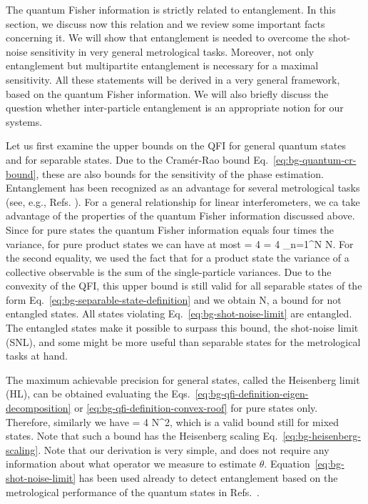 
The quantum Fisher information is strictly related to entanglement.
In this section, we discuss now this relation and we review some important facts concerning it.
We will show that entanglement is needed to overcome the shot-noise sensitivity in very general metrological tasks.
Moreover, not only entanglement but multipartite entanglement is necessary for a maximal sensitivity.
All these statements will be derived in a very general framework, based on the quantum Fisher information.
We will also briefly discuss the question whether inter-particle entanglement is an appropriate notion for our systems.

Let us first examine the upper bounds on the QFI for general quantum states and for separable states.
Due to the Cram\'er-Rao bound Eq.~\eqref{eq:bg-quantum-cr-bound}, these are also bounds for the sensitivity of the phase estimation.
Entanglement has been recognized as an advantage for several metrological tasks (see, e.g., Refs. \citep{Sorensen2001, Boixo2008}).
For a general relationship for linear interferometers, we ca take advantage of the properties of the quantum Fisher information discussed above.
Since for pure states the quantum Fisher information equals four times the variance, for pure product states we can have at most
\be
   = 4 = 4 \sum_{n=1}^N  \leq N.
\ee
For the second equality, we used the fact that for a product state the variance of a collective observable is the sum of the single-particle variances.
Due to the convexity of the QFI, this upper bound is still valid for all separable states of the form Eq.~\eqref{eq:bg-separable-state-definition} and we obtain \citep{Pezze2009}
\be
  \label{eq:bg-shot-noise-limit}
   \leq N,
\ee
a bound for not entangled states.
All states violating Eq.~\eqref{eq:bg-shot-noise-limit} are entangled.
The entangled states make it possible to surpass this bound, the shot-noise limit (SNL), and some might be more useful than separable states for the metrological tasks at hand.

The maximum achievable precision for general states, called the Heisenberg limit (HL), can be obtained evaluating the Eqs.~\eqref{eq:bg-qfi-definition-eigen-decomposition} or \eqref{eq:bg-qfi-definition-convex-roof} for pure states only.
Therefore, similarly we have
\be
  \label{eq:bg-heisenberg-limit}
   = 4 \leq N^2,
\ee
which is a valid bound still for mixed states.
Note that such a bound has the Heisenberg scaling Eq.~\eqref{eq:bg-heisenberg-scaling}.
Note that our derivation is very simple, and does not require any information about what operator we measure to estimate $\theta$.
Equation~\eqref{eq:bg-shot-noise-limit} has been used already to detect entanglement based on the metrological performance of the quantum states in Refs.~\citep{Krischek2011, Luecke2011}.

